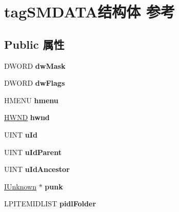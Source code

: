 \hypertarget{structtag_s_m_d_a_t_a}{}\section{tag\+S\+M\+D\+A\+T\+A结构体 参考}
\label{structtag_s_m_d_a_t_a}
\subsection*{Public 属性}
\begin{DoxyCompactItemize}
\item 
\mbox{\label{structtag_s_m_d_a_t_a_a1f6180109c22ca256204618c208c59af}} 
D\+W\+O\+RD {\bfseries dw\+Mask}
\item 
\mbox{\label{structtag_s_m_d_a_t_a_af72aba9617a7b8a16d479b7900766942}} 
D\+W\+O\+RD {\bfseries dw\+Flags}
\item 
\mbox{\label{structtag_s_m_d_a_t_a_a76096dd581af70517e4aa7cdef0593a6}} 
H\+M\+E\+NU {\bfseries hmenu}
\item 
\mbox{\label{structtag_s_m_d_a_t_a_a6da7041b6d58a33707dc1bc147787e0a}} 
\hyperlink{interfacevoid}{H\+W\+ND} {\bfseries hwnd}
\item 
\mbox{\label{structtag_s_m_d_a_t_a_a691fffaec15ab68fdb41a1ba0db0eada}} 
U\+I\+NT {\bfseries u\+Id}
\item 
\mbox{\label{structtag_s_m_d_a_t_a_ad969b74697cc8e4353b675ff91ce2d2b}} 
U\+I\+NT {\bfseries u\+Id\+Parent}
\item 
\mbox{\label{structtag_s_m_d_a_t_a_a5d9f8ec23439bac53c29768bfd3a4e67}} 
U\+I\+NT {\bfseries u\+Id\+Ancestor}
\item 
\mbox{\label{structtag_s_m_d_a_t_a_a4d91dafe7308c80433abf7bc44a5de57}} 
\hyperlink{interface_i_unknown}{I\+Unknown} $\ast$ {\bfseries punk}
\item 
\mbox{\label{structtag_s_m_d_a_t_a_a0a08085ae43ffd446f24ad99a878dca4}} 
L\+P\+I\+T\+E\+M\+I\+D\+L\+I\+ST {\bfseries pidl\+Folder}

\end{DoxyCompactItemize}
